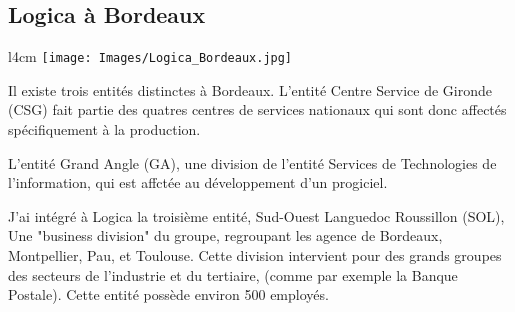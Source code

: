 \subsection{Logica à Bordeaux}
\begin{wrapfigure}[6]{l}{4cm}
\texttt{[image: Images/Logica\_Bordeaux.jpg]}
\end{wrapfigure}

Il existe trois entités distinctes à Bordeaux. L'entité Centre Service de Gironde (CSG) fait partie des quatres centres de services nationaux qui sont donc affectés spécifiquement à la production.

L'entité Grand Angle (GA), une division de l'entité Services de Technologies de l'information, qui est affctée au développement d'un progiciel.

J'ai intégré à Logica la troisième entité, Sud-Ouest Languedoc Roussillon (SOL), Une "business division" du groupe, regroupant les agence de Bordeaux, Montpellier, Pau, et Toulouse. Cette division intervient pour des grands groupes des secteurs de l'industrie et du tertiaire, (comme par exemple la Banque Postale). Cette entité possède environ 500 employés.


